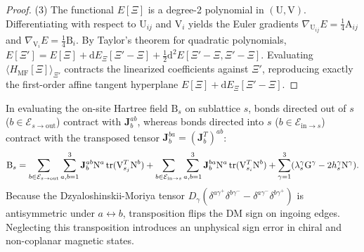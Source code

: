 \begin{proof}
(3) The functional $E[\Xi]$ is a degree-2 polynomial in $(\mathrm{U}, \mathrm{V})$. Differentiating with respect to $\mathrm{U}_{ij}$ and $\mathrm{V}_i$ yields the Euler gradients $\nabla_{\mathrm{U}_{ij}} E = \frac{1}{4}\mathrm{A}_{ij}$ and $\nabla_{\mathrm{V}_i} E = \frac{1}{4}\mathrm{B}_i$. By Taylor's theorem for quadratic polynomials, $E[\Xi'] = E[\Xi] + \mathrm{d}E_\Xi[\Xi' - \Xi] + \frac{1}{2}\mathrm{d}^2 E[\Xi' - \Xi, \Xi' - \Xi]$. Evaluating $\langle H_{\mathrm{MF}}[\Xi] \rangle_{\Xi'}$ contracts the linearized coefficients against $\Xi'$, reproducing exactly the first-order affine tangent hyperplane $E[\Xi] + \mathrm{d}E_\Xi[\Xi' - \Xi]$.
\end{proof}

\begin{remark}
\label{rem:m1_2_dm_transposition}
In evaluating the on-site Hartree field $\mathrm{B}_s$ on sublattice $s$, bonds directed out of $s$ ($b \in \mathcal{E}_{s \to \mathrm{out}}$) contract with $\mathbf{J}_b^{ab}$, whereas bonds directed into $s$ ($b \in \mathcal{E}_{\mathrm{in} \to s}$) contract with the transposed tensor $\mathbf{J}_b^{ba} = (\mathbf{J}_b^T)^{ab}$:
\begin{equation}
\label{eq:m1_2_Bs_exact}
\mathrm{B}_s = \sum_{b \in \mathcal{E}_{s \to \mathrm{out}}} \sum_{a,b=1}^3 \mathbf{J}_b^{ab} \mathrm{N}^a \operatorname{tr}(\mathrm{V}_{s_j}^T \mathrm{N}^b) + \sum_{b \in \mathcal{E}_{\mathrm{in} \to s}} \sum_{a,b=1}^3 \mathbf{J}_b^{ba} \mathrm{N}^a \operatorname{tr}(\mathrm{V}_{s_i}^T \mathrm{N}^b) + \sum_{\gamma=1}^3 (\lambda_s^\gamma \mathrm{G}^\gamma - 2 h_s^\gamma \mathrm{N}^\gamma).
\end{equation}
Because the Dzyaloshinskii-Moriya tensor $D_\gamma(\delta^{a\gamma^+}\delta^{b\gamma^-} - \delta^{a\gamma^-}\delta^{b\gamma^+})$ is antisymmetric under $a \leftrightarrow b$, transposition flips the DM sign on ingoing edges. Neglecting this transposition introduces an unphysical sign error in chiral and non-coplanar magnetic states.
\end{remark}

